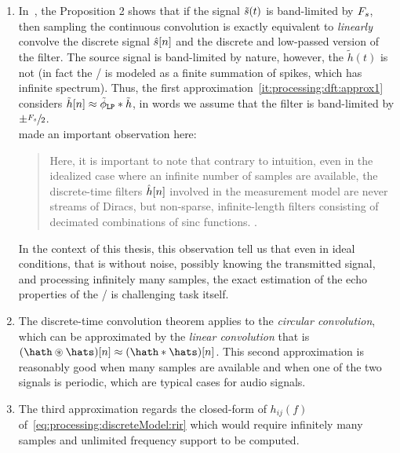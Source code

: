 \begin{enumerate}[label=(\roman*)]
    \item\label{it:processing:dft:approx1}
    In~, the Proposition 2 shows that if the signal $\tilde{s}(t)$ is band-limited by $F_s$,
    then sampling the continuous convolution is exactly equivalent to \textit{linearly} convolve the discrete signal $\hat{s}[n]$ and the discrete and low-passed version of the filter.
    The source signal is band-limited by nature, however, the $\tilde{h}(t)$ is not (in fact the \RIR/ is modeled as a finite summation of spikes, which has infinite spectrum).
    Thus, the first approximation~\ref{it:processing:dft:approx1} considers $\tilde{h}[n] \approx \lowpassfilter \convDis \tilde{h}$, in words
    we assume that the filter is band-limited by $\pm \sfrac{F_s}{2}$.
    \\\citeauthor{tukuljac2018mulan} made an important observation here:
    \begin{quote}
        Here, it is important to note that contrary to intuition, even in the idealized case where an infinite number of samples are available, the discrete-time filters $\hat{h}[n]$
        involved in the measurement model are never streams of Diracs, but non-sparse, infinite-length filters consisting of decimated combinations of sinc functions.
        .
    \end{quote}
    In the context of this thesis, this observation tell us that even in ideal conditions, that is without noise, possibly knowing the transmitted signal, and processing infinitely
    many samples, the exact estimation of the echo properties of the \RIR/ is challenging task itself.

    \item\label{it:processing:dft:approx2}
    The discrete-time convolution theorem applies to the \textit{circular convolution}, which can be approximated by the \textit{linear convolution}
    that is $(\hath \circledast \hats)[n] \approx (\hath \convDis \hats)[n]$.
    This second approximation is reasonably good when many samples are available and when one of the two signals is periodic, which
    are typical cases for audio signals.

    \item\label{it:processing:dft:approx3}
    The third approximation regards the closed-form of $h_{ij}(f)$ of~\cref{eq:processing:discreteModel:rir} which
    would require infinitely many samples and unlimited frequency support to be computed.
\end{enumerate}

